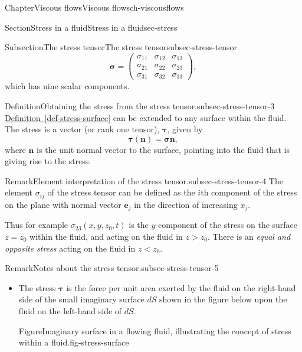 \documentclass[oneside,10pt,]{book}
\newcommand{\xreffont}{\relax}
\numberwithin{equation}{section}
\newcommand{\be}{\boldsymbol{e}}
\newcommand{\bn}{\boldsymbol{n}}
\newcommand{\bsigma}{\boldsymbol{\sigma}}
\newcommand{\btau}{\boldsymbol{\tau}}
\begin{document}
\begin{chapterptx}{Chapter}{Viscous flows}{}{Viscous flows}{}{}{ch-viscousflows}
\begin{sectionptx}{Section}{Stress in a fluid}{}{Stress in a fluid}{}{}{sec-stress}
\begin{subsectionptx}{Subsection}{The stress tensor}{}{The stress tensor}{}{}{subsec-stress-tensor}
\begin{equation}
\bsigma=\left(\begin{matrix}
\sigma_{11} & \sigma_{12} & \sigma_{13} \\
\sigma_{21} & \sigma_{22} & \sigma_{23} \\
\sigma_{31} & \sigma_{32} & \sigma_{33}
\end{matrix}\right),\label{eqn-stress-tensor}
\end{equation}
which has nine scalar components.%
\begin{definition}{Definition}{Obtaining the stress from the stress tensor.}{subsec-stress-tensor-3}%
\hyperref[def-stress-surface]{Definition~{\xreffont\ref{def-stress-surface}}} can be extended to any surface within the fluid. The stress is a vector (or rank one tensor), \(\btau\), given by%
\begin{equation}
\btau(\bn)=\bsigma\bn,\label{eqn-stress-on-surface}
\end{equation}
where \(\bn\) is the unit normal vector to the surface, pointing into the fluid that is giving rise to the stress.%
\end{definition}
\begin{remark}{Remark}{Element interpretation of the stress tensor.}{subsec-stress-tensor-4}%
The element \(\sigma_{ij}\) of the stress tensor can be defined as the \(i\)th component of the stress on the plane with normal vector \(\be_j\) in the direction of increasing \(x_j\).%
\par
Thus for example \(\sigma_{23}(x,y,z_0,t)\) is the \(y\)-component of the stress on the surface \(z=z_0\) within the fluid, and acting on the fluid in \(z>z_0\). There is an \emph{equal and opposite stress} acting on the fluid in \(z<z_0\).%
\end{remark}
\begin{remark}{Remark}{Notes about the stress tensor.}{subsec-stress-tensor-5}%
%
\begin{itemize}[label=\textbullet]
\item{}The stress \(\btau\) is the force per unit area exerted by the fluid on the right-hand side of the small imaginary surface \(dS\) shown in the figure below upon the fluid on the left-hand side of \(dS\).%
\begin{figureptx}{Figure}{Imaginary surface in a flowing fluid, illustrating the concept of stress within a fluid.}{fig-stress-surface}{}%
\begin{image}{0.2}{0.6}{0.2}{}%

\end{image}
\end{figureptx}
\end{itemize}
\end{remark}
\end{subsectionptx}
\end{sectionptx}
\end{chapterptx}
\end{document}
